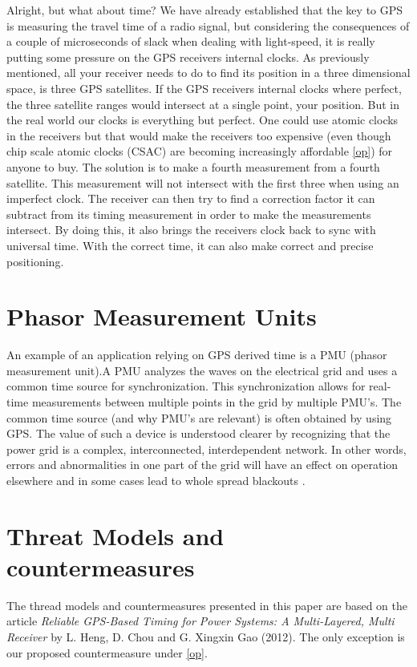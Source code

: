 \documentclass[12pt,english,a4paper]{article}
\begin{document}
Alright, but what about time? We have already established that the key to GPS is measuring the travel time of a radio signal, but considering the consequences of a couple of microseconds of slack when dealing with light-speed, it is really putting some pressure on the GPS receivers internal clocks. As previously mentioned, all your receiver needs to do to find its position in a three dimensional space, is three GPS satellites. If the GPS receivers internal clocks where perfect, the three satellite ranges would intersect at a single point, your position. But in the real world our clocks is everything but perfect. One could use atomic clocks  in the receivers but that would make the receivers too expensive (even though chip scale atomic clocks (CSAC) are becoming increasingly affordable \ref{op}) for anyone to buy. The solution is to make a fourth measurement from a fourth satellite. This measurement will not intersect with the first three when using an imperfect clock. The receiver can then try to find a correction factor it can subtract from its timing measurement in order to make the measurements intersect. By doing this, it also brings the receivers clock back to sync with universal time. With the correct time, it can also make correct and precise positioning. \cite{TRIMBLETIME}

\section{Phasor Measurement Units}
An example of an application relying on GPS derived time is a PMU (phasor measurement unit).A PMU analyzes the waves on the electrical grid and uses a common time source for synchronization. This synchronization allows for real-time measurements between multiple points in the grid by multiple PMU's. The common time source (and why PMU's are relevant) is often obtained by using GPS. \cite{YLJRNR} The value of such a device is understood clearer by recognizing that the power grid is a complex, interconnected, interdependent network. In other words, errors and abnormalities in one part of the grid will have an effect on operation elsewhere and in some cases lead to whole spread blackouts \cite{EVPMUGA}.

\section{Threat Models and countermeasures}
The thread models and countermeasures presented in this paper are based on the article \textit{Reliable GPS-Based Timing for Power Systems: A Multi-Layered, Multi Receiver} by L. Heng, D. Chou and G. Xingxin Gao (2012). The only exception is our proposed countermeasure under \ref{op}.
\end{document}
